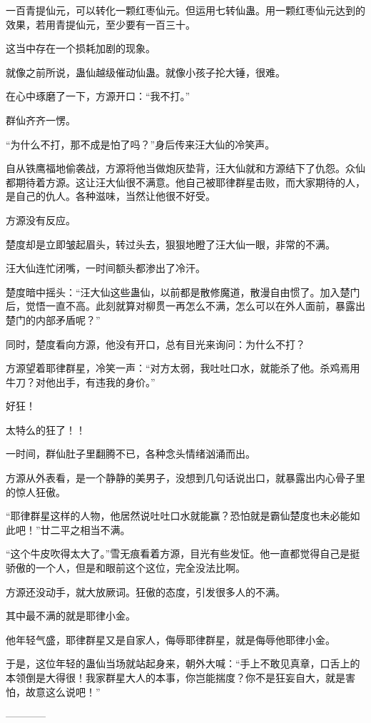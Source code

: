 \begin{this_body}
一百青提仙元，可以转化一颗红枣仙元。但运用七转仙蛊。用一颗红枣仙元达到的效果，若用青提仙元，至少要有一百三十。

这当中存在一个损耗加剧的现象。

就像之前所说，蛊仙越级催动仙蛊。就像小孩子抡大锤，很难。

在心中琢磨了一下，方源开口：“我不打。”

群仙齐齐一愣。

“为什么不打，那不成是怕了吗？”身后传来汪大仙的冷笑声。

自从铁鹰福地偷袭战，方源将他当做炮灰垫背，汪大仙就和方源结下了仇怨。众仙都期待着方源。这让汪大仙很不满意。他自己被耶律群星击败，而大家期待的人，是自己的仇人。各种滋味，当然让他很不好受。

方源没有反应。

楚度却是立即皱起眉头，转过头去，狠狠地瞪了汪大仙一眼，非常的不满。

汪大仙连忙闭嘴，一时间额头都渗出了冷汗。

楚度暗中摇头：“汪大仙这些蛊仙，以前都是散修魔道，散漫自由惯了。加入楚门后，觉悟一直不高。此刻就算对柳贯一再怎么不满，怎么可以在外人面前，暴露出楚门的内部矛盾呢？”

同时，楚度看向方源，他没有开口，总有目光来询问：为什么不打？

方源望着耶律群星，冷笑一声：“对方太弱，我吐吐口水，就能杀了他。杀鸡焉用牛刀？对他出手，有违我的身价。”

好狂！

太特么的狂了！！

一时间，群仙肚子里翻腾不已，各种念头情绪汹涌而出。

方源从外表看，是一个静静的美男子，没想到几句话说出口，就暴露出内心骨子里的惊人狂傲。

“耶律群星这样的人物，他居然说吐吐口水就能赢？恐怕就是霸仙楚度也未必能如此吧！”廿二平之相当不满。

“这个牛皮吹得太大了。”雪无痕看着方源，目光有些发怔。他一直都觉得自己是挺骄傲的一个人，但是和眼前这个这位，完全没法比啊。

方源还没动手，就大放厥词。狂傲的态度，引发很多人的不满。

其中最不满的就是耶律小金。

他年轻气盛，耶律群星又是自家人，侮辱耶律群星，就是侮辱他耶律小金。

于是，这位年轻的蛊仙当场就站起身来，朝外大喊：“手上不敢见真章，口舌上的本领倒是大得很！我家群星大人的本事，你岂能揣度？你不是狂妄自大，就是害怕，故意这么说吧！”

------------


\end{this_body}
